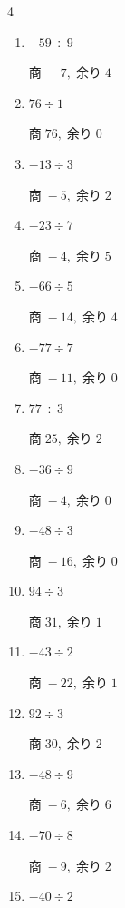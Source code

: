 \begin{multicols}{4}
\begin{enumerate}
  \item $-59 \div 9$

        $商\; -7,\; 余り\; 4$

\columnbreak %

\resetques

  \item $76 \div 1$

        $商\; 76,\; 余り\; 0$

  \item $-13 \div 3$

        $商\; -5,\; 余り\; 2$

  \item $-23 \div 7$

        $商\; -4,\; 余り\; 5$

  \item $-66 \div 5$

        $商\; -14,\; 余り\; 4$

  \item $-77 \div 7$

        $商\; -11,\; 余り\; 0$

  \item $77 \div 3$

        $商\; 25,\; 余り\; 2$

  \item $-36 \div 9$

        $商\; -4,\; 余り\; 0$

  \item $-48 \div 3$

        $商\; -16,\; 余り\; 0$

  \item $94 \div 3$

        $商\; 31,\; 余り\; 1$

  \item $-43 \div 2$

        $商\; -22,\; 余り\; 1$

  \item $92 \div 3$

        $商\; 30,\; 余り\; 2$

  \item $-48 \div 9$

        $商\; -6,\; 余り\; 6$

  \item $-70 \div 8$

        $商\; -9,\; 余り\; 2$

  \item $-40 \div 2$


\end{enumerate}
\end{multicols}

